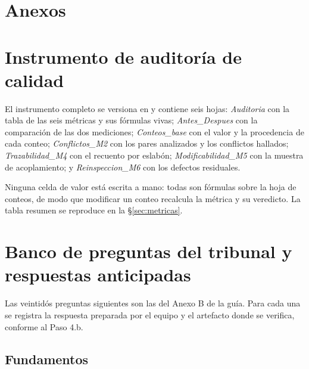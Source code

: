 \appendix
\section*{Anexos}
\setcounter{section}{0}
\renewcommand{\thesection}{\Alph{section}}

\section{Instrumento de auditoría de calidad}

El instrumento completo se versiona en  y contiene
seis hojas: \emph{Auditoria} con la tabla de las seis métricas y sus fórmulas vivas;
\emph{Antes\_Despues} con la comparación de las dos mediciones; \emph{Conteos\_base} con el valor y la
procedencia de cada conteo; \emph{Conflictos\_M2} con los pares analizados y los conflictos hallados;
\emph{Trazabilidad\_M4} con el recuento por eslabón; \emph{Modificabilidad\_M5} con la muestra de
acoplamiento; y \emph{Reinspeccion\_M6} con los defectos residuales.

Ninguna celda de valor está escrita a mano: todas son fórmulas sobre la hoja de conteos, de modo que
modificar un conteo recalcula la métrica y su veredicto. La tabla resumen se reproduce en la
\S\ref{sec:metricas}.

\section{Banco de preguntas del tribunal y respuestas anticipadas}

Las veintidós preguntas siguientes son las del Anexo B de la guía. Para cada una se registra la
respuesta preparada por el equipo y el artefacto donde se verifica, conforme al Paso 4.b.

\subsection*{Fundamentos}

